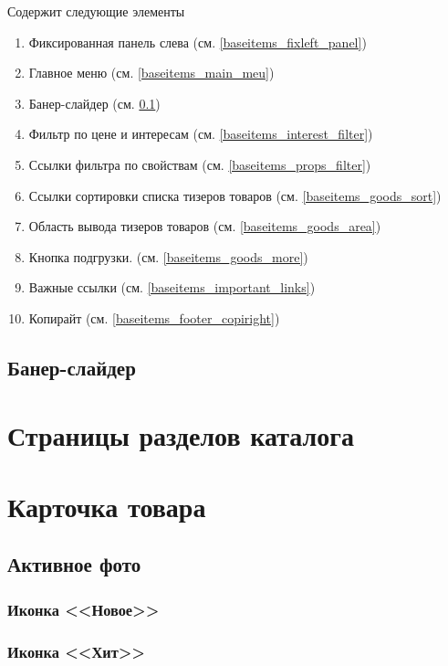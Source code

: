         Содержит следующие элементы
        \begin{enumerate}
            \item Фиксированная панель слева (см. \ref{baseitems_fixleft_panel})
            \item Главное меню (см. \ref{baseitems_main_meu})
            \item Банер-слайдер (см. \ref{slider})
            \item Фильтр по цене и интересам (см. \ref{baseitems_interest_filter})
            \item Ссылки фильтра по свойствам (см. \ref{baseitems_props_filter})
            \item Ссылки сортировки списка тизеров товаров (см. \ref{baseitems_goods_sort})
            \item Область вывода тизеров товаров (см. \ref{baseitems_goods_area})
            \item Кнопка подгрузки.  (см. \ref{baseitems_goods_more})
            \item Важные ссылки (см. \ref{baseitems_important_links})
            \item Копирайт (см. \ref{baseitems_footer_copiright})
        \end{enumerate}
    
        \subsection{Банер-слайдер}
            \label{slider}

    \section{Страницы разделов каталога}
        \label{page_catalog_section}


    \section{Карточка товара}
        \subsection{Активное фото}
            \subsubsection{Иконка <<Новое>>}
            \subsubsection{Иконка <<Хит>>}

